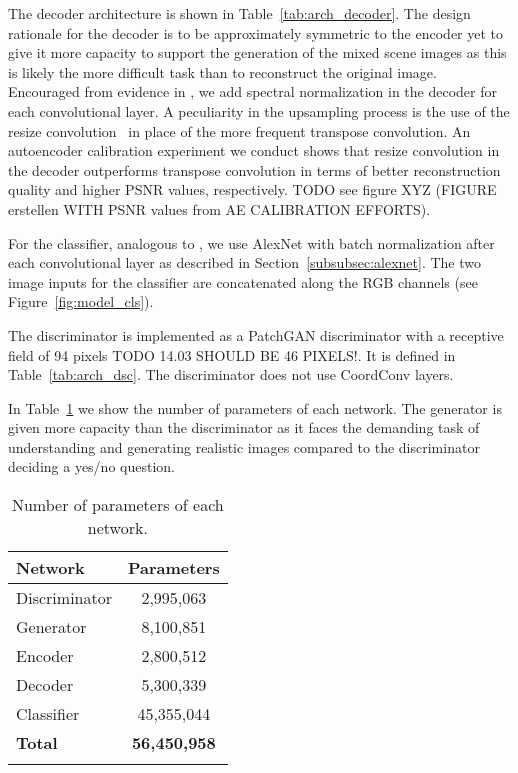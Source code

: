 \documentclass[12pt,a4paper]{article}
\begin{document}
The decoder architecture is shown in Table~\ref{tab:arch_decoder}. The design rationale for the decoder is to be approximately symmetric to the encoder yet to give it more capacity to support the generation of the mixed scene images as this is likely the more difficult task than to reconstruct the original image. Encouraged from evidence in \cite{SAGAN}, we add spectral normalization in the decoder for each convolutional layer. A peculiarity in the upsampling process is the use of the resize convolution~\cite{ResizeConv} in place of the more frequent transpose convolution. An autoencoder calibration experiment we conduct shows that resize convolution in the decoder outperforms transpose convolution in terms of better reconstruction quality and higher PSNR values, respectively. TODO see figure XYZ (FIGURE erstellen WITH PSNR values from AE CALIBRATION EFFORTS).



For the classifier, analogous to \cite{DisentFacOfVarByMixTh}, we use AlexNet with batch normalization after each convolutional layer as described in Section~\ref{subsubsec:alexnet}. The two image inputs for the classifier are concatenated along the RGB channels (see Figure~\ref{fig:model_cls}).

The discriminator is implemented as a PatchGAN discriminator with a receptive field of 94 pixels TODO 14.03 SHOULD BE 46 PIXELS!. It is defined in Table~\ref{tab:arch_dsc}. The discriminator does not use CoordConv layers.



In Table~\ref{tab:params} we show the number of parameters of each network. The generator is given more capacity than the discriminator as it faces the demanding task of understanding and generating realistic images compared to the discriminator deciding a yes/no question.
\begin{table} [ht!]
\centering
\begin{tabular}{l|c}
\Xhline{0.8pt}
\textbf{Network} & \textbf{Parameters}\\
\hline
Discriminator & 2,995,063 \\
\hline
Generator & 8,100,851 \\
\hline
Encoder & 2,800,512 \\
\hline
Decoder & 5,300,339 \\
\hline
Classifier & 45,355,044 \\
\hline
\textbf{Total} & \textbf{56,450,958} \\
\Xhline{0.8pt}
\end{tabular}
\caption{Number of parameters of each network.} \label{tab:params}
\end{table}
\end{document}

